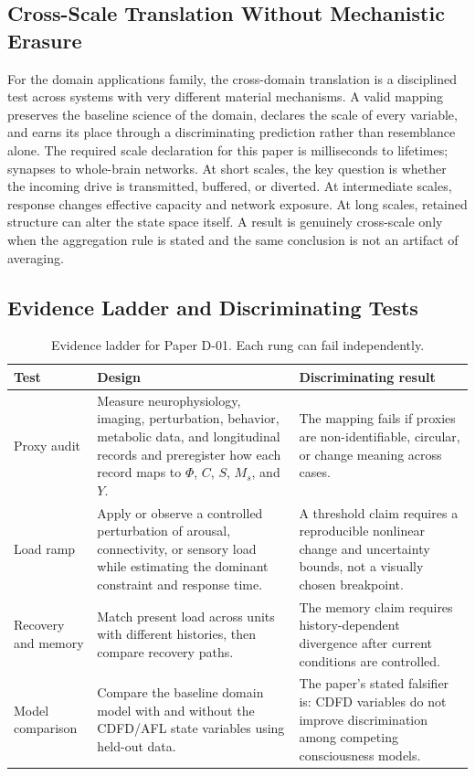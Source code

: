 \documentclass[11pt,a4paper]{article}
\begin{document}
\subsection{Cross-Scale Translation Without Mechanistic Erasure}

For the domain applications family, the cross-domain translation is a disciplined test across systems with very different material mechanisms. A valid mapping preserves the baseline science of the domain, declares the scale of every variable, and earns its place through a discriminating prediction rather than resemblance alone. \cite{Holling1973,Turing1952,Shannon1948,BakTangWiesenfeld1987}
The required scale declaration for this paper is milliseconds to lifetimes; synapses to whole-brain networks. At short
scales, the key question is whether the incoming drive is transmitted,
buffered, or diverted. At intermediate scales, response changes effective
capacity and network exposure. At long scales, retained structure can alter the
state space itself. A result is genuinely cross-scale only when the aggregation
rule is stated and the same conclusion is not an artifact of averaging.

\subsection{Evidence Ladder and Discriminating Tests}

\begin{table}[htbp]
\centering
\small
\caption{Evidence ladder for Paper D-01. Each rung can fail independently.}
\begin{tabularx}{\textwidth}{|p{}|X|X|}
\hline
\textbf{Test} & \textbf{Design} & \textbf{Discriminating result} \\
\hline
Proxy audit & Measure neurophysiology, imaging, perturbation, behavior, metabolic data, and longitudinal records and preregister how each record maps to $\Phi$, $C$, $S$, $M_s$, and $Y$. & The mapping fails if proxies are non-identifiable, circular, or change meaning across cases. \\
\hline
Load ramp & Apply or observe a controlled perturbation of arousal, connectivity, or sensory load while estimating the dominant constraint and response time. & A threshold claim requires a reproducible nonlinear change and uncertainty bounds, not a visually chosen breakpoint. \\
\hline
Recovery and memory & Match present load across units with different histories, then compare recovery paths. & The memory claim requires history-dependent divergence after current conditions are controlled. \\
\hline
Model comparison & Compare the baseline domain model with and without the CDFD/AFL state variables using held-out data. & The paper's stated falsifier is: CDFD variables do not improve discrimination among competing consciousness models. \\
\hline
\end{tabularx}
\end{table}
\end{document}
